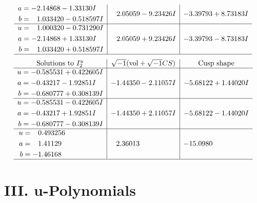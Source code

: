 \documentclass[1p]{elsarticle_modified}
\theoremstyle{definition}
\newcommand{\I}{\sqrt{-1}}
\begin{document}
$$\begin{array}{c|c|c}
\begin{aligned}
a &= -2.14868 - 1.33130 I \\
b &= \phantom{-}1.033420 - 0.518597 I\end{aligned}
 & \phantom{-}2.05059 - 9.23426 I & -3.39793 + 8.73183 I \\ \hline\begin{aligned}
u &= \phantom{-}1.000320 - 0.731290 I \\
a &= -2.14868 + 1.33130 I \\
b &= \phantom{-}1.033420 + 0.518597 I\end{aligned}
 & \phantom{-}2.05059 + 9.23426 I & -3.39793 - 8.73183 I\\
 \hline 
 \end{array}$$\newpage$$\begin{array}{c|c|c}  
\text{Solutions to }I^u_{2}& \I (\text{vol} + \sqrt{-1}CS) & \text{Cusp shape}\\
 \hline 
\begin{aligned}
u &= -0.585531 + 0.422605 I \\
a &= -0.43217 - 1.92851 I \\
b &= -0.680777 + 0.308139 I\end{aligned}
 & -1.44350 - 2.11057 I & -5.68122 + 1.44020 I \\ \hline\begin{aligned}
u &= -0.585531 - 0.422605 I \\
a &= -0.43217 + 1.92851 I \\
b &= -0.680777 - 0.308139 I\end{aligned}
 & -1.44350 + 2.11057 I & -5.68122 - 1.44020 I \\ \hline\begin{aligned}
u &= \phantom{-}0.493256\phantom{ +0.000000I} \\
a &= \phantom{-}1.41129\phantom{ +0.000000I} \\
b &= -1.46168\phantom{ +0.000000I}\end{aligned}
 & \phantom{-}2.36013\phantom{ +0.000000I} & -15.0980\phantom{ +0.000000I}\\
 \hline 
 \end{array}$$\newpage
\newpage\renewcommand{\arraystretch}{1}
\centering \section*{ III. u-Polynomials}
\end{document}
